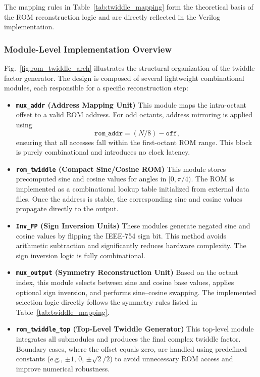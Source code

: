 The mapping rules in Table~\ref{tab:twiddle_mapping} form the theoretical basis of the ROM reconstruction logic and are directly reflected in the Verilog implementation.

\subsubsection{Module-Level Implementation Overview}

Fig.~\ref{fig:rom_twiddle_arch} illustrates the structural organization of the twiddle factor generator.
The design is composed of several lightweight combinational modules, each responsible for a specific reconstruction step:

\begin{itemize}
    \item \textbf{\texttt{mux\_addr} (Address Mapping Unit)}  
    This module maps the intra-octant offset to a valid ROM address.
    For odd octants, address mirroring is applied using
    \[
    \texttt{rom\_addr} = (N/8) - \texttt{off},
    \]
    ensuring that all accesses fall within the first-octant ROM range.
    This block is purely combinational and introduces no clock latency.

    \item \textbf{\texttt{rom\_twiddle} (Compact Sine/Cosine ROM)}  
    This module stores precomputed sine and cosine values for angles in $[0,\pi/4)$.
    The ROM is implemented as a combinational lookup table initialized from external data files.
    Once the address is stable, the corresponding sine and cosine values propagate directly to the output.

    \item \textbf{\texttt{Inv\_FP} (Sign Inversion Units)}  
    These modules generate negated sine and cosine values by flipping the IEEE-754 sign bit.
    This method avoids arithmetic subtraction and significantly reduces hardware complexity.
    The sign inversion logic is fully combinational.

    \item \textbf{\texttt{mux\_output} (Symmetry Reconstruction Unit)}  
    Based on the octant index, this module selects between sine and cosine base values,
    applies optional sign inversion, and performs sine--cosine swapping.
    The implemented selection logic directly follows the symmetry rules listed in
    Table~\ref{tab:twiddle_mapping}.

    \item \textbf{\texttt{rom\_twiddle\_top} (Top-Level Twiddle Generator)}  
    This top-level module integrates all submodules and produces the final complex twiddle factor.
    Boundary cases, where the offset equals zero, are handled using predefined constants
    (e.g., $\pm1$, $0$, $\pm\sqrt{2}/2$) to avoid unnecessary ROM access and improve numerical robustness.
\end{itemize}

